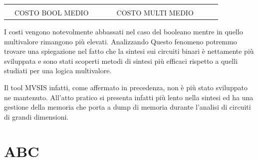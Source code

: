 \documentclass[
]{book}
\begin{document}
\begin{longtable}[]{@{}lllllllll@{}}
\begin{minipage}[t]{0.07\columnwidth}
\strut
\end{minipage}\tabularnewline
\begin{minipage}[t]{0.07\columnwidth}\raggedright
\strut
\end{minipage} & \begin{minipage}[t]{0.11\columnwidth}\raggedright
COSTO BOOL MEDIO\strut
\end{minipage} & \begin{minipage}[t]{0.08\columnwidth}\raggedright
\strut
\end{minipage} & \begin{minipage}[t]{0.07\columnwidth}\raggedright
\strut
\end{minipage} & \begin{minipage}[t]{0.09\columnwidth}\raggedright
\strut
\end{minipage} & \begin{minipage}[t]{0.12\columnwidth}\raggedright
COSTO MULTI MEDIO\strut
\end{minipage} & \begin{minipage}[t]{0.08\columnwidth}\raggedright
\strut
\end{minipage} & \begin{minipage}[t]{0.07\columnwidth}\raggedright
\strut
\end{minipage} & \begin{minipage}[t]{0.07\columnwidth}\raggedright
\strut
\end{minipage}\tabularnewline
\bottomrule
\end{longtable}

I costi vengono notevolmente abbassati nel caso del booleano mentre in quello multivalore rimangono più elevati. Analizzando Questo fenomeno potremmo trovare una spiegazione nel fatto che la sintesi sui circuiti binari è nettamente più sviluppata e sono stati scoperti metodi di sintesi più efficaci rispetto a quelli studiati per una logica multivalore.

Il tool MVSIS infatti, come affermato in precedenza, non è più stato sviluppato ne mantenuto. All'atto pratico si presenta infatti più lento nella sintesi ed ha una gestione della memoria che porta a dump di memoria durante l'analisi di circuiti di grandi dimensioni.

\newpage

\hypertarget{abc-2}{%
\section{ABC}\label{abc-2}}
\end{document}
